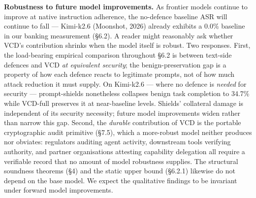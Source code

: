 \textbf{Robustness to future model improvements.} As frontier models
continue to improve at native instruction adherence, the no-defence
baseline ASR will continue to fall --- Kimi-k2.6 (Moonshot, 2026)
already exhibits a 0.0\% baseline in our banking measurement (§6.2). A
reader might reasonably ask whether VCD's contribution shrinks when the
model itself is robust. Two responses. First, the load-bearing empirical
comparison throughout §6.2 is between text-side defences and VCD
\emph{at equivalent security}; the benign-preservation gap is a property
of how each defence reacts to legitimate prompts, not of how much attack
reduction it must supply. On Kimi-k2.6 --- where no defence is
\emph{needed} for security --- prompt-shields nonetheless collapses
benign task completion to 34.7\% while VCD-full preserves it at
near-baseline levels. Shields' collateral damage is independent of its
security necessity; future model improvements widen rather than narrow
this gap. Second, the \emph{durable} contribution of VCD is the portable
cryptographic audit primitive (§7.5), which a more-robust model neither
produces nor obviates: regulators auditing agent activity, downstream
tools verifying authority, and partner organisations attesting
capability delegation all require a verifiable record that no amount of
model robustness supplies. The structural soundness theorems (§4) and
the static upper bound (§6.2.1) likewise do not depend on the base
model. We expect the qualitative findings to be invariant under forward
model improvements.
